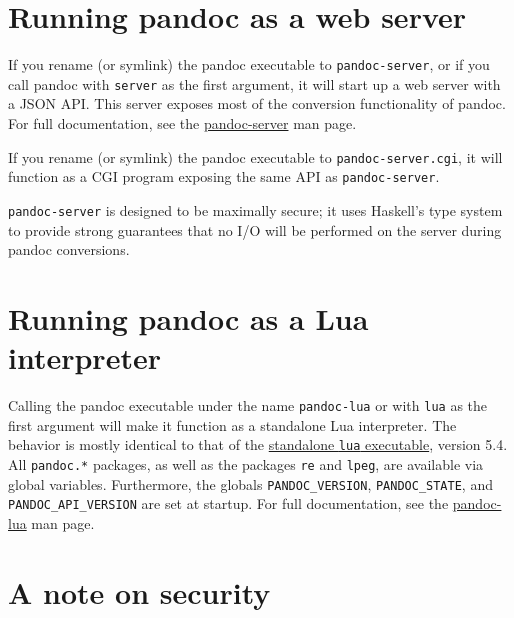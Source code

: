 \documentclass[
]{article}
\begin{document}
\hypertarget{running-pandoc-as-a-web-server}{%
\section{Running pandoc as a web
server}\label{running-pandoc-as-a-web-server}}

If you rename (or symlink) the pandoc executable to
\texttt{pandoc-server}, or if you call pandoc with \texttt{server} as
the first argument, it will start up a web server with a JSON API. This
server exposes most of the conversion functionality of pandoc. For full
documentation, see the
\href{https://github.com/jgm/pandoc/blob/master/doc/pandoc-server.md}{pandoc-server}
man page.

If you rename (or symlink) the pandoc executable to
\texttt{pandoc-server.cgi}, it will function as a CGI program exposing
the same API as \texttt{pandoc-server}.

\texttt{pandoc-server} is designed to be maximally secure; it uses
Haskell's type system to provide strong guarantees that no I/O will be
performed on the server during pandoc conversions.

\hypertarget{running-pandoc-as-a-lua-interpreter}{%
\section{Running pandoc as a Lua
interpreter}\label{running-pandoc-as-a-lua-interpreter}}

Calling the pandoc executable under the name \texttt{pandoc-lua} or with
\texttt{lua} as the first argument will make it function as a standalone
Lua interpreter. The behavior is mostly identical to that of the
\href{https://www.lua.org/manual/5.4/manual.html\#7}{standalone
\texttt{lua} executable}, version 5.4. All \texttt{pandoc.*} packages,
as well as the packages \texttt{re} and \texttt{lpeg}, are available via
global variables. Furthermore, the globals \texttt{PANDOC\_VERSION},
\texttt{PANDOC\_STATE}, and \texttt{PANDOC\_API\_VERSION} are set at
startup. For full documentation, see the
\href{https://github.com/jgm/pandoc/blob/master/doc/pandoc-lua.md}{pandoc-lua}
man page.

\hypertarget{a-note-on-security}{%
\section{A note on security}\label{a-note-on-security}}
\end{document}
